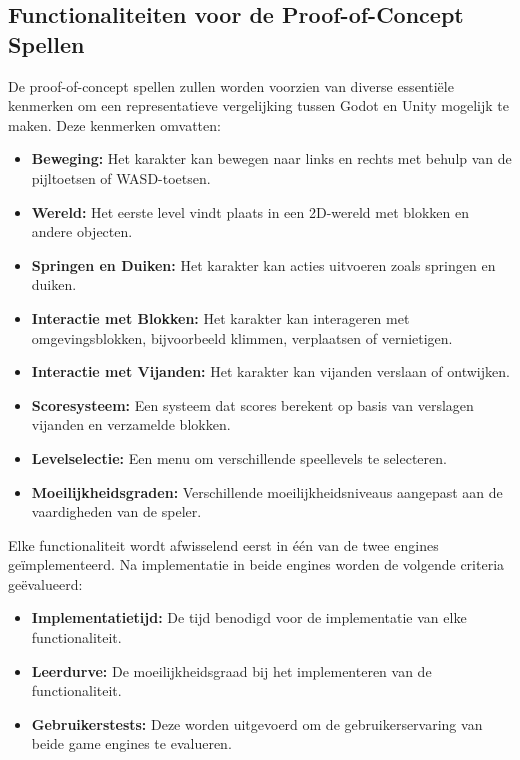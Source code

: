 \subsection{Functionaliteiten voor de Proof-of-Concept Spellen}

De proof-of-concept spellen zullen worden voorzien van diverse essentiële kenmerken om een representatieve vergelijking tussen Godot en Unity mogelijk te maken. Deze kenmerken omvatten:

\begin{itemize}
    \item \textbf{Beweging:} Het karakter kan bewegen naar links en rechts met behulp van de pijltoetsen of WASD-toetsen.
    \item \textbf{Wereld:} Het eerste level vindt plaats in een 2D-wereld met blokken en andere objecten.
    \item \textbf{Springen en Duiken:} Het karakter kan acties uitvoeren zoals springen en duiken.
    \item \textbf{Interactie met Blokken:} Het karakter kan interageren met omgevingsblokken, bijvoorbeeld klimmen, verplaatsen of vernietigen.
    \item \textbf{Interactie met Vijanden:} Het karakter kan vijanden verslaan of ontwijken.
    \item \textbf{Scoresysteem:} Een systeem dat scores berekent op basis van verslagen vijanden en verzamelde blokken.
    \item \textbf{Levelselectie:} Een menu om verschillende speellevels te selecteren.
    \item \textbf{Moeilijkheidsgraden:} Verschillende moeilijkheidsniveaus aangepast aan de vaardigheden van de speler.
\end{itemize}

Elke functionaliteit wordt afwisselend eerst in één van de twee engines geïmplementeerd. Na implementatie in beide engines worden de volgende criteria geëvalueerd:
\begin{itemize}
    \item \textbf{Implementatietijd:} De tijd benodigd voor de implementatie van elke functionaliteit.
    \item \textbf{Leerdurve:} De moeilijkheidsgraad bij het implementeren van de functionaliteit.
    \item \textbf{Gebruikerstests:} Deze worden uitgevoerd om de gebruikerservaring van beide game engines te evalueren.
\end{itemize}

